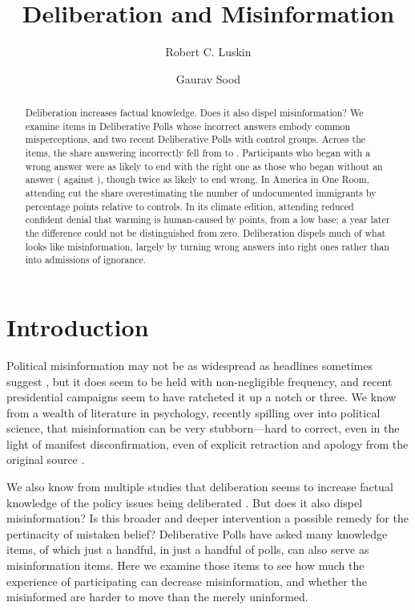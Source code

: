 \documentclass[11pt]{article}
\title{Deliberation and Misinformation}
\author{Robert C. Luskin \and Gaurav Sood}
\date{}
\begin{document}
\maketitle

\begin{abstract}
\noindent Deliberation increases factual knowledge. Does it also dispel misinformation? We examine \nItems{} items in \nPolls{} Deliberative Polls whose incorrect answers embody common misperceptions, and two recent Deliberative Polls with control groups. Across the \nItems{} items, the share answering incorrectly fell from \wrongBefore{} to \wrongAfter{}. Participants who began with a wrong answer were as likely to end with the right one as those who began without an answer (\wrongToRight{} against \dkToRight{}), though twice as likely to end wrong. In America in One Room, attending cut the share overestimating the number of undocumented immigrants by \immEffect{} percentage points relative to controls. In its climate edition, attending reduced confident denial that warming is human-caused by \denyEffect{} points, from a low base; a year later the difference could not be distinguished from zero. Deliberation dispels much of what looks like misinformation, largely by turning wrong answers into right ones rather than into admissions of ignorance.
\end{abstract}

\section{Introduction}

Political misinformation may not be as widespread as headlines sometimes suggest \citep{luskin2026mm}, but it does seem to be held with non-negligible frequency, and recent presidential campaigns seem to have ratcheted it up a notch or three. We know from a wealth of literature in psychology, recently spilling over into political science, that misinformation can be very stubborn---hard to correct, even in the light of manifest disconfirmation, even of explicit retraction and apology from the original source \citep{lewandowsky2012, nyhan2010b}.

We also know from multiple studies that deliberation seems to increase factual knowledge of the policy issues being deliberated \citep{luskin2002, fishkin2021, luskin2026dp}. But does it also dispel misinformation? Is this broader and deeper intervention a possible remedy for the pertinacity of mistaken belief? Deliberative Polls have asked many knowledge items, of which just a handful, in just a handful of polls, can also serve as misinformation items. Here we examine those items to see how much the experience of participating can decrease misinformation, and whether the misinformed are harder to move than the merely uninformed.
\end{document}

